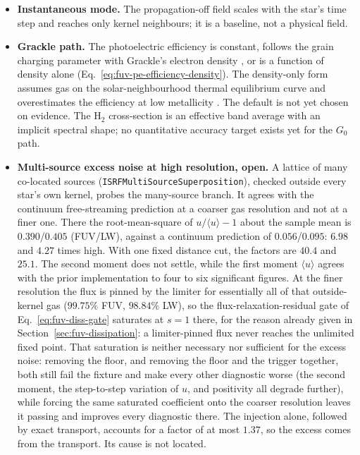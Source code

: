 \begin{itemize}
    softer than reality, and two beams crossing at a particle are merged
    into one direction; both are intrinsic to a two-moment closure. A
    source moving relative to its gas trails a field lagging by
    $v_{\rm rel}\lambda/c_{\rm hyp}$, $c/c_{\rm hyp}$ times the physical
    lag.
  \item \textbf{Instantaneous mode.} The propagation-off field scales
    with the star's time step and reaches only kernel neighbours; it is
    a baseline, not a physical field.
  \item \textbf{Grackle path.} The photoelectric efficiency is constant,
    follows the grain charging parameter with Grackle's electron density
    \citep[their Eq.~2]{Wolfire1995}, or is a function of density alone
    (Eq.~\ref{eq:fuv-pe-efficiency-density}). The density-only form
    assumes gas on the solar-neighbourhood thermal equilibrium curve and
    overestimates the efficiency at low metallicity \citep{Smith2026}.
    The default is not yet chosen on evidence. The H$_2$ cross-section is an effective
    band average with an implicit spectral shape; no quantitative
    accuracy target exists yet for the $G_0$ path.
  \item \textbf{Multi-source excess noise at high resolution, open.} A
    lattice of many co-located sources (\texttt{ISRFMultiSourceSuperposition}),
    checked outside every star's own kernel, probes the many-source
    branch. It agrees with the continuum free-streaming prediction at a
    coarser gas resolution and not at a finer one. There the root-mean-square of $u/\langle u\rangle-1$
    about the sample mean is $0.390$/$0.405$ (FUV/LW), against a continuum
    prediction of $0.056$/$0.095$: $6.98$ and $4.27$ times high. With one
    fixed distance cut, the factors are
    $40.4$ and $25.1$. The second moment does not settle, while the first
    moment
    $\langle u\rangle$ agrees with the prior implementation to four to six
    significant figures. At the finer resolution the flux is pinned by the limiter
    for essentially all of that outside-kernel gas ($99.75\%$ FUV,
    $98.84\%$ LW), so the flux-relaxation-residual gate of
    Eq.~\ref{eq:fuv-diss-gate} saturates at $s=1$ there, for the reason
    already given in Section~\ref{sec:fuv-dissipation}: a limiter-pinned
    flux never reaches the unlimited fixed point. That saturation is neither
    necessary nor sufficient for the excess noise: removing the floor,
    and removing the floor and the trigger together, both still fail the
    fixture and make every other diagnostic worse (the second moment,
    the step-to-step variation of $u$, and positivity all degrade
    further), while forcing the same saturated coefficient onto the
    coarser resolution leaves it passing and improves every diagnostic
    there. The injection alone, followed by exact transport, accounts for
    a factor of at most $1.37$, so the excess comes from the transport.
    Its cause is not located.
\end{itemize}
